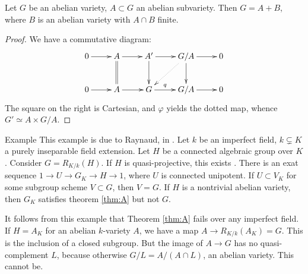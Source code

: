 \begin{coro}
Let $G$ be an abelian variety, $A\subset G$ an abelian subvariety. Then 
$G=A + B$, where $B$ is an abelian variety with $A\cap B$ finite. 
\end{coro}
\begin{proof}
We have a commutative diagram:
\[\xymatrix{
  0 \ar[r] 
    & A \ar[r] \ar@{=}[d] 
    & A' \ar[r] \ar[d] 
    & G/A \ar[r] \ar[d] \ar@{.>}[dl] 
    & 0 \\
  0 \ar[r] 
    & A \ar[r] 
    & G \ar[r]^-q 
    & G/A \ar[r] 
    & 0 
}\]
The square on the right is Cartesian, and $\varphi$ yields the dotted map, 
whence $G'\simeq A\times G/A$.   
\end{proof}

\begin{enonce}[remark]{Example}
This example is due to Raynaud, in \cite[XVIII.A3]{sga3}. Let $k$ be an 
imperfect field, $k\subsetneq K$ a purely inseparable field extension. Let 
$H$ be a connected algebraic group over $K$. Consider 
$G=R_{K/k}(H)$. If $H$ is quasi-projective, this exists \cite[A]{cgp10}. There 
is an exat sequence $1 \to U \to G_K\to H \to 1$, where $U$ is connected 
unipotent. If $U\subset V_K$ for some subgroup scheme $V\subset G$, then $V=G$. 
If $H$ is a nontrivial abelian variety, then $G_K$ satisfies theorem 
\ref{thm:A} but not $G$. 
\end{enonce}

It follows from this example that Theorem \ref{thm:A} fails over any 
imperfect field. If $H=A_K$ for an abelian $k$-variety $A$, we have a map 
$A\to R_{K/k}(A_K)=G$. This is the inclusion of a closed subgroup. But the 
image of $A\to G$ has no quasi-complement $L$, because otherwise 
$G/L=A/(A\cap L)$, an abelian variety. This cannot be. 

